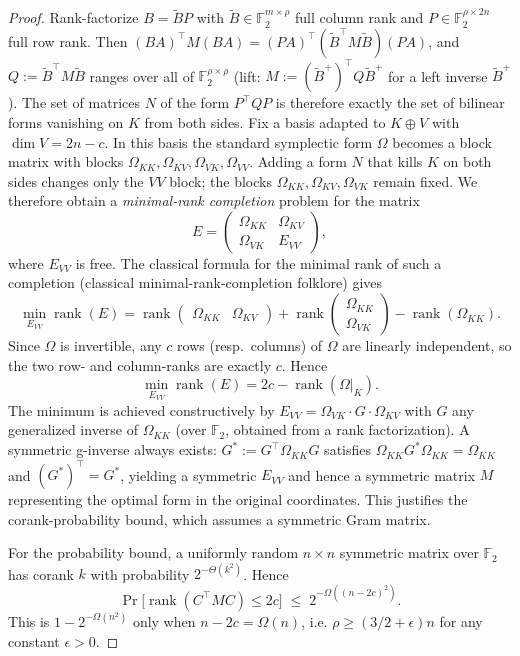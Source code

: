 \documentclass[11pt,a4paper]{article}
\theoremstyle{plain}
\theoremstyle{definition}
\newcommand{\F}{\mathbb{F}}
\begin{document}
\begin{proof}
Rank-factorize $B = \tilde{B} P$ with $\tilde{B} \in \F_2^{m \times \rho}$ full column rank and $P \in \F_2^{\rho \times 2n}$ full row rank. Then $(BA)^{\top} M (BA) = (PA)^{\top} (\tilde{B}^{\top} M \tilde{B}) (PA)$, and $Q := \tilde{B}^{\top} M \tilde{B}$ ranges over all of $\F_2^{\rho \times \rho}$ (lift: $M := (\tilde{B}^{+})^{\top} Q \tilde{B}^{+}$ for a left inverse $\tilde{B}^{+}$). The set of matrices $N$ of the form $P^{\top}QP$ is therefore exactly the set of bilinear forms vanishing on $K$ from both sides. Fix a basis adapted to $K \oplus V$ with $\dim V = 2n-c$. In this basis the standard symplectic form $\Omega$ becomes a block matrix with blocks $\Omega_{KK}, \Omega_{KV}, \Omega_{VK}, \Omega_{VV}$. Adding a form $N$ that kills $K$ on both sides changes only the $VV$ block; the blocks $\Omega_{KK}, \Omega_{KV}, \Omega_{VK}$ remain fixed. We therefore obtain a \emph{minimal-rank completion} problem for the matrix
\[
E = \begin{pmatrix} \Omega_{KK} & \Omega_{KV} \\ \Omega_{VK} & E_{VV} \end{pmatrix},
\]
where $E_{VV}$ is free. The classical formula for the minimal rank of such a completion (classical minimal-rank-completion folklore) gives
\[
\min_{E_{VV}} \operatorname{rank}(E)
= \operatorname{rank}\begin{pmatrix} \Omega_{KK} & \Omega_{KV} \end{pmatrix}
+ \operatorname{rank}\begin{pmatrix} \Omega_{KK} \\ \Omega_{VK} \end{pmatrix}
- \operatorname{rank}(\Omega_{KK}).
\]
Since $\Omega$ is invertible, any $c$ rows (resp.\ columns) of $\Omega$ are linearly independent, so the two row- and column-ranks are exactly $c$. Hence
\[
\min_{E_{VV}} \operatorname{rank}(E) = 2c - \operatorname{rank}(\Omega|_K).
\]
The minimum is achieved constructively by $E_{VV} = \Omega_{VK} \cdot G \cdot \Omega_{KV}$ with $G$ any generalized inverse of $\Omega_{KK}$ (over $\F_2$, obtained from a rank factorization). A symmetric g-inverse always exists: $G^* := G^{\top} \Omega_{KK} G$ satisfies $\Omega_{KK} G^* \Omega_{KK} = \Omega_{KK}$ and $(G^*)^{\top} = G^*$, yielding a symmetric $E_{VV}$ and hence a symmetric matrix $M$ representing the optimal form in the original coordinates. This justifies the corank-probability bound, which assumes a symmetric Gram matrix.

For the probability bound, a uniformly random $n \times n$ symmetric matrix over $\F_2$ has corank $k$ with probability $2^{-\Theta(k^2)}$. Hence
\[
\Pr\bigl[\operatorname{rank}(C^{\top}MC) \le 2c\bigr] \;\le\; 2^{-\Omega((n-2c)^2)}.
\]
This is $1 - 2^{-\Omega(n^2)}$ only when $n - 2c = \Omega(n)$, i.e. $\rho \ge (3/2+\epsilon)n$ for any constant $\epsilon>0$.
\end{proof}
\end{document}
